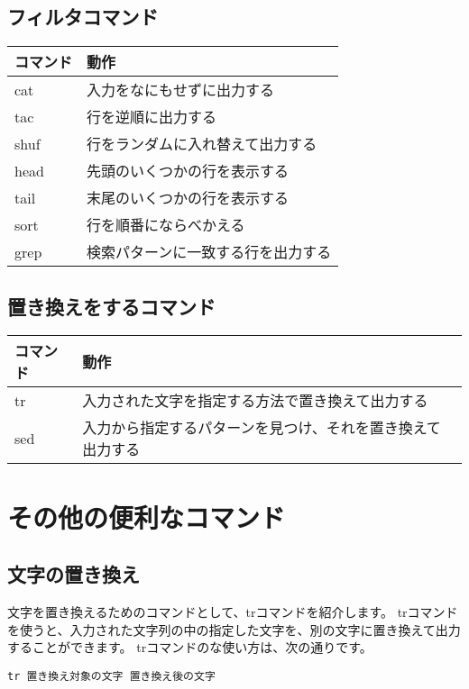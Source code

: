 \subsection{フィルタコマンド}
\begin{tabular}{ll}
    コマンド & 動作 \\ \hline
    cat & 入力をなにもせずに出力する \\
    tac & 行を逆順に出力する\\
    shuf & 行をランダムに入れ替えて出力する \\
    head & 先頭のいくつかの行を表示する \\
    tail & 末尾のいくつかの行を表示する\\
    sort & 行を順番にならべかえる\\
    grep & 検索パターンに一致する行を出力する\\ \hline
\end{tabular}


\subsection{置き換えをするコマンド}
\begin{tabular}{ll}
    コマンド & 動作 \\ \hline
    tr & 入力された文字を指定する方法で置き換えて出力する \\
    sed & 入力から指定するパターンを見つけ、それを置き換えて出力する \\ \hline
\end{tabular}


\section{その他の便利なコマンド}

\subsection{文字の置き換え}
文字を置き換えるためのコマンドとして、trコマンドを紹介します。
trコマンドを使うと、入力された文字列の中の指定した文字を、別の文字に置き換えて出力することができます。
trコマンドのな使い方は、次の通りです。

\begin{lstlisting}[caption=trコマンドの基本的な使い方, label=tr_basic_usage]
tr 置き換え対象の文字 置き換え後の文字
\end{lstlisting}

